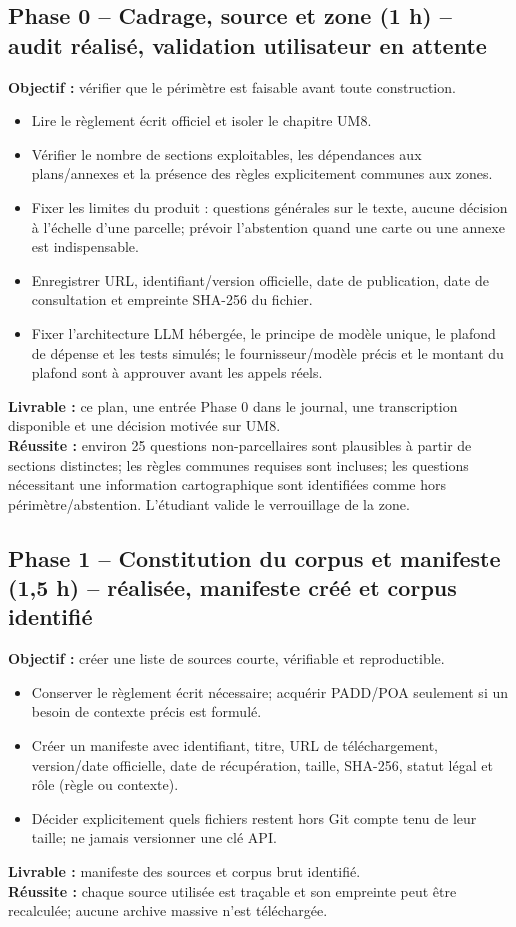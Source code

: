 \documentclass[11pt,a4paper]{article}
\begin{document}
\subsection*{Phase 0 -- Cadrage, source et zone (1 h) -- audit réalisé, validation utilisateur en attente}
\textbf{Objectif :} vérifier que le périmètre est faisable avant toute construction.
\begin{itemize}
  \item Lire le règlement écrit officiel et isoler le chapitre UM8.
  \item Vérifier le nombre de sections exploitables, les dépendances aux plans/annexes et la présence des règles explicitement communes aux zones.
  \item Fixer les limites du produit : questions générales sur le texte, aucune décision à l'échelle d'une parcelle; prévoir l'abstention quand une carte ou une annexe est indispensable.
  \item Enregistrer URL, identifiant/version officielle, date de publication, date de consultation et empreinte SHA-256 du fichier.
  \item Fixer l'architecture LLM hébergée, le principe de modèle unique, le plafond de dépense et les tests simulés; le fournisseur/modèle précis et le montant du plafond sont à approuver avant les appels réels.
\end{itemize}
\textbf{Livrable :} ce plan, une entrée Phase 0 dans le journal, une transcription disponible et une décision motivée sur UM8.\\
\textbf{Réussite :} environ 25 questions non-parcellaires sont plausibles à partir de sections distinctes; les règles communes requises sont incluses; les questions nécessitant une information cartographique sont identifiées comme hors périmètre/abstention. L'étudiant valide le verrouillage de la zone.

\subsection*{Phase 1 -- Constitution du corpus et manifeste (1,5 h) -- réalisée, manifeste créé et corpus identifié}
\textbf{Objectif :} créer une liste de sources courte, vérifiable et reproductible.
\begin{itemize}
  \item Conserver le règlement écrit nécessaire; acquérir PADD/POA seulement si un besoin de contexte précis est formulé.
  \item Créer un manifeste avec identifiant, titre, URL de téléchargement, version/date officielle, date de récupération, taille, SHA-256, statut légal et rôle (règle ou contexte).
  \item Décider explicitement quels fichiers restent hors Git compte tenu de leur taille; ne jamais versionner une clé API.
\end{itemize}
\textbf{Livrable :} manifeste des sources et corpus brut identifié.\\
\textbf{Réussite :} chaque source utilisée est traçable et son empreinte peut être recalculée; aucune archive massive n'est téléchargée.
\end{document}

